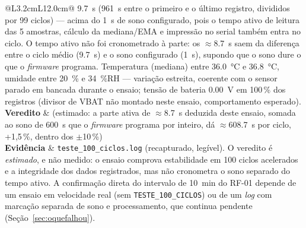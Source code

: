 \begin{table}[H]
\begin{tabular}{@{}L{3.2cm}L{12.0cm}@{}}
  \SI{9,7}{\second} (\SI{961}{\second} entre o primeiro e o último
  registro, divididos por 99 ciclos) --- acima do \SI{1}{\second} de sono
  configurado, pois o tempo ativo de leitura das 5 amostras, cálculo da
  mediana/EMA e impressão no serial também entra no ciclo. O tempo ativo
  não foi cronometrado à parte: os $\approx$\SI{8,7}{\second} saem da
  diferença entre o ciclo médio (\SI{9,7}{\second}) e o sono configurado
  (\SI{1}{\second}), supondo que o sono dure o que o \emph{firmware}
  programa. Temperatura (mediana) entre
  \SI{36,0}{\celsius} e \SI{36,8}{\celsius}, umidade entre
  \SI{20}{\percent} e \SI{34}{\percent}RH --- variação estreita, coerente
  com o sensor parado em bancada durante o ensaio; tensão de bateria
  \SI{0.00}{\volt} em 100\,\% dos registros (divisor de VBAT não montado
  neste ensaio, comportamento esperado). \\
\textbf{Veredito} & \aprovado{} (estimado: a parte ativa de $\approx$\SI{8,7}{\second} deduzida deste ensaio, somada ao sono de \SI{600}{\second} que o \emph{firmware} programa por inteiro, dá $\approx$\SI{608,7}{\second} por ciclo, +1,5\,\%, dentro dos $\pm$10\,\%) \\
\textbf{Evidência} & \texttt{teste\_100\_ciclos.log} (recapturado, legível).
  O veredito é \emph{estimado}, e não medido: o ensaio comprova
  estabilidade em 100 ciclos acelerados e a integridade dos dados
  registrados, mas não cronometra o sono separado do tempo ativo. A
  confirmação direta do intervalo de \SI{10}{\minute} do RF-01 depende de
  um ensaio em velocidade real (sem \texttt{TESTE\_100\_CICLOS}) ou de
  um \emph{log} com marcação separada de sono e processamento, que
  continua pendente (Seção~\ref{sec:oquefalhou}). \\
\bottomrule
\end{tabular}
\end{table}

